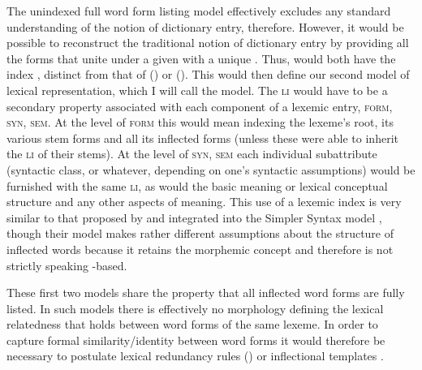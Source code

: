 \documentclass[output=paper]{langsci/langscibook}
\begin{document}
The unindexed full word form listing  model  effectively excludes any standard understanding of the notion of dictionary entry, therefore. However, it would be possible to reconstruct the traditional notion of dictionary entry by providing all the forms that unite under a given  with a unique . Thus,  would both have the index , distinct from that of  () or  (). This would then define our second model of lexical representation, which I will call the  model. The \textsc{li} would have to be a secondary property associated with each component of a lexemic entry, \textsc{form}, \textsc{syn}, \textsc{sem}. At the level of \textsc{form} this would mean indexing the lexeme's root, its various stem forms and all its inflected forms (unless these were able to inherit the \textsc{li} of their stems). At the level of \textsc{syn}, \textsc{sem} each individual subattribute (syntactic class,  or whatever, depending on one's syntactic assumptions) would be furnished with the same \textsc{li}, as would the basic meaning or lexical conceptual structure and any other aspects of meaning. This use of a lexemic index is very  similar to that proposed by \citet{jackendoff97} and integrated into the Simpler Syntax model \citep{Culicover:Jackendoff05}, though their model makes rather different assumptions about the structure of inflected words because it retains the morphemic concept and therefore is not strictly speaking -based.


These first two models share the property that all inflected word forms are fully listed. In such models there is effectively no morphology defining the lexical relatedness that holds between word forms of the same lexeme. In order to capture formal similarity/iden\-tity between word forms it would therefore be necessary to postulate lexical redundancy rules (\citealt{Jackendoff75,Bochner93}) or inflectional templates
\citep{AckermanBlevinsMalouf09}.
\end{document}
